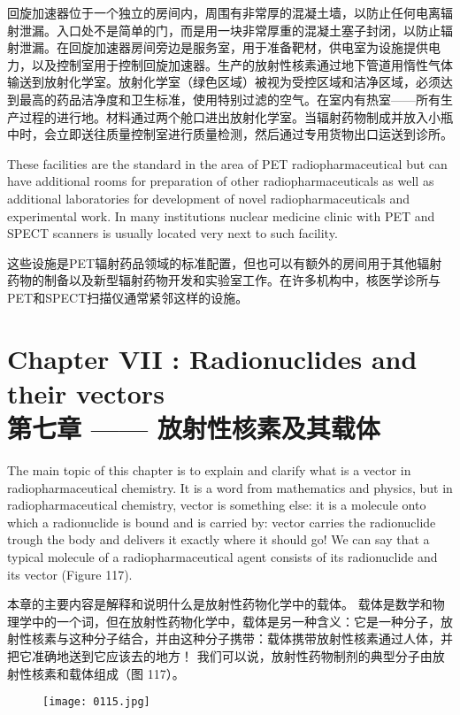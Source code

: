 \documentclass[dvipsnames, svgnames,a4paper,11pt]{article}
\begin{document}
回旋加速器位于一个独立的房间内，周围有非常厚的混凝土墙，以防止任何电离辐射泄漏。入口处不是简单的门，而是用一块非常厚重的混凝土塞子封闭，以防止辐射泄漏。在回旋加速器房间旁边是服务室，用于准备靶材，供电室为设施提供电力，以及控制室用于控制回旋加速器。生产的放射性核素通过地下管道用惰性气体输送到放射化学室。放射化学室（绿色区域）被视为受控区域和洁净区域，必须达到最高的药品洁净度和卫生标准，使用特别过滤的空气。在室内有热室——所有生产过程的进行地。材料通过两个舱口进出放射化学室。当辐射药物制成并放入小瓶中时，会立即送往质量控制室进行质量检测，然后通过专用货物出口运送到诊所。



These facilities are the standard in the area of PET radiopharmaceutical but can
have additional rooms for preparation of other radiopharmaceuticals as well as
additional laboratories for development of novel radiopharmaceuticals and
experimental work. In many institutions nuclear medicine clinic with PET and SPECT
scanners is usually located very next to such facility.

这些设施是PET辐射药品领域的标准配置，但也可以有额外的房间用于其他辐射药物的制备以及新型辐射药物开发和实验室工作。在许多机构中，核医学诊所与PET和SPECT扫描仪通常紧邻这样的设施。

\newpage


\section{Chapter VII : Radionuclides and their vectors\\第七章 —— 放射性核素及其载体}
The main topic of this chapter is to explain and clarify what is a vector in
radiopharmaceutical chemistry. It is a word from mathematics and physics, but in
radiopharmaceutical chemistry, vector is something else: it is a molecule onto which
a radionuclide is bound and is carried by: vector carries the radionuclide trough the
body and delivers it exactly where it should go! We can say that a typical molecule of
a radiopharmaceutical agent consists of its radionuclide and its vector (Figure 117).

本章的主要内容是解释和说明什么是放射性药物化学中的载体。 载体是数学和物理学中的一个词，但在放射性药物化学中，载体是另一种含义：它是一种分子，放射性核素与这种分子结合，并由这种分子携带：载体携带放射性核素通过人体，并把它准确地送到它应该去的地方！ 我们可以说，放射性药物制剂的典型分子由放射性核素和载体组成（图 117）。

\begin{figure}[h]
    \centering
    \texttt{[image: 0115.jpg]}
     \label{fig117}
\end{figure}
\end{document}

